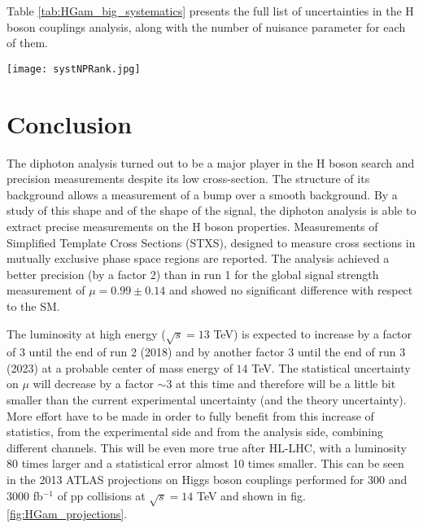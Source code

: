 \begin{enumerate}
  \label{sec:org5b8bbd9}
Table \ref{tab:HGam_big_systematics} presents the full list of uncertainties in the H boson couplings analysis, along with the number of nuisance parameter for each of them.


\begin{table}[h!]
  \begin{center}
    \texttt{[image: systNPRank.jpg]}
\caption{Summary of sources of systematic uncertainty $\sigma_i$ ($i$ is the index to each of the unique nuisance parameters~$\theta$);
the factor in the likelihood function ${F_\mathrm{G}(\sigma,\theta)}$ or ${F_\mathrm{LN}(\sigma,\theta)}$
that implements their impact on signal yields,
mass resolution and scale, and the spurious signals resulting from the background parameterization.%
When acting on $N_\mathrm{S}^\mathrm{tot}$ the  uncertainty value is  the same for  all processes,
whereas  the uncertainty has a different value for each signal process for  the case  denoted~$N_\mathrm{S}^{p}$.
\cite{ATLAS-CONF-2017-045}}
\label{tab:HGam_big_systematics}
\end{center}
\end{table}
\end{enumerate}



\section{Conclusion}
\label{sec:orgffb6129}
The diphoton analysis turned out to be a major player in the H boson search and precision measurements despite its low cross-section.
The structure of its background allows a measurement of a bump over a smooth background.
By a study of this shape and of the shape of the signal, the diphoton analysis is able to extract precise measurements on the H boson properties.
Measurements of Simplified Template Cross Sections (STXS), designed to measure cross sections in mutually exclusive phase space regions are reported.
The analysis achieved a better precision (by a factor 2) than in run 1 for the global signal strength measurement of $\mu=0.99\pm 0.14$ and showed no significant difference with respect to the SM.

The luminosity at high energy ($\sqrt{s}=13$ TeV) is expected to increase by a factor of 3 until the end of run 2 (2018) and by another factor 3 until the end of run 3 (2023) at a probable center of mass energy of $14$ TeV.
The statistical uncertainty on $\mu$ will decrease by a factor $\sim 3$ at this time and therefore will be a little bit smaller than the current experimental uncertainty (and the theory uncertainty).
More effort have to be made in order to fully benefit from this increase of statistics, from the experimental side and from the analysis side, combining different channels.
This will be even more true after HL-LHC, with a luminosity 80 times larger and a statistical error almost 10 times smaller.
This can be seen in the 2013 ATLAS projections on Higgs boson couplings performed for 300 and 3000 fb$^{-1}$ of pp collisions at $\sqrt{s}=14$ TeV \cite{} and shown in fig. \ref{fig:HGam_projections}.

